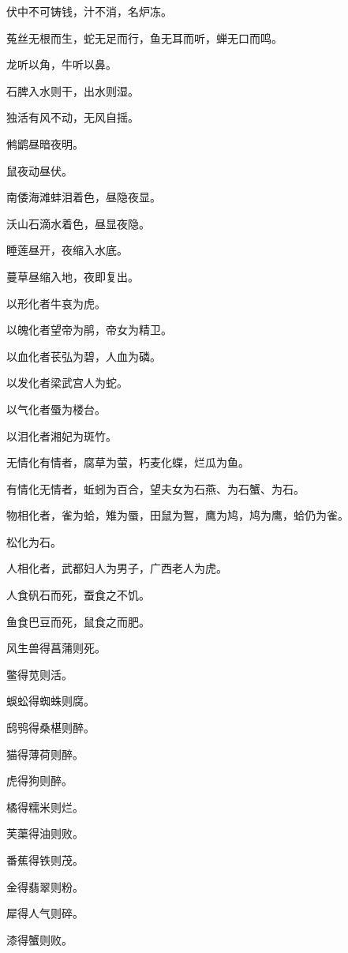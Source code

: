 \documentclass[a4paper,12pt,UTF8,twoside]{ctexbook}
\begin{document}
    伏中不可铸钱，汁不消，名炉冻。
    
    菟丝无根而生，蛇无足而行，鱼无耳而听，蝉无口而鸣。
    
    龙听以角，牛听以鼻。
    
    石脾入水则干，出水则湿。
    
    独活有风不动，无风自摇。
    
    鸺鹠昼暗夜明。
    
    鼠夜动昼伏。
    
    南倭海滩蚌泪着色，昼隐夜显。
    
    沃山石滴水着色，昼显夜隐。
    
    睡莲昼开，夜缩入水底。
    
    蔓草昼缩入地，夜即复出。
    
    以形化者牛哀为虎。
    
    以魄化者望帝为鹃，帝女为精卫。
    
    以血化者苌弘为碧，人血为磷。
    
    以发化者梁武宫人为蛇。
    
    以气化者蜃为楼台。
    
    以泪化者湘妃为斑竹。
    
    无情化有情者，腐草为萤，朽麦化蝶，烂瓜为鱼。
    
    有情化无情者，蚯蚓为百合，望夫女为石燕、为石蟹、为石。
    
    物相化者，雀为蛤，雉为蜃，田鼠为鴽，鹰为鸠，鸠为鹰，蛤仍为雀。
    
    松化为石。
    
    人相化者，武都妇人为男子，广西老人为虎。
    
    人食矾石而死，蚕食之不饥。
    
    鱼食巴豆而死，鼠食之而肥。
    
    风生兽得菖蒲则死。
    
    鳖得苋则活。
    
    蜈蚣得蜘蛛则腐。
    
    鸱鸮得桑椹则醉。
    
    猫得薄荷则醉。
    
    虎得狗则醉。
    
    橘得糯米则烂。
    
    芙蕖得油则败。
    
    番蕉得铁则茂。
    
    金得翡翠则粉。
    
    犀得人气则碎。
    
    漆得蟹则败。
    
\end{document}
